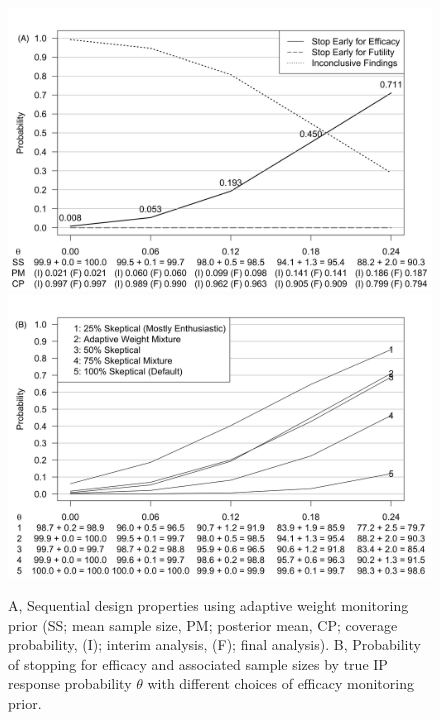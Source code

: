 \documentclass[AMA,STIX1COL,doublespace]{WileyNJD-v2}
\begin{document}
\begin{figure}
\begin{center}
      \includegraphics[width=6in]{figure9.png}
   \includegraphics[width=6in]{figure6.png}
    \caption{A, Sequential design properties using adaptive weight monitoring prior (SS; mean sample size, PM; posterior mean, CP; coverage probability, (I); interim analysis, (F); final analysis). B, Probability of stopping for efficacy and associated sample sizes by true IP response probability $\theta$ with different choices of efficacy monitoring prior.}
\label{fig:ex2varyomega}
 \end{center}
\end{figure}
\end{document}
